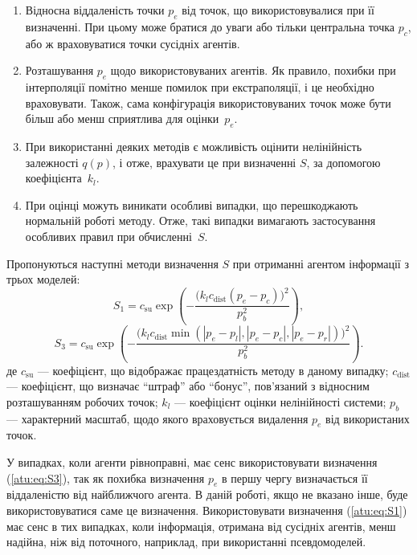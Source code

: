 \begin{enumerate}

  \item
    Відносна віддаленість точки
    $ p_e $ від точок, що використовувалися при її визначенні. При
    цьому може братися до уваги або тільки центральна точка
    $ p_c $, або ж враховуватися точки сусідніх агентів.

  \item
    Розташування
    $ p_e $ щодо використовуваних агентів. Як правило, похибки при
    інтерполяції помітно менше помилок при екстраполяції,
    і це необхідно враховувати. Також, сама конфігурація
    використовуваних точок може бути більш або менш сприятлива для
    оцінки~$p_e$.

  \item
    При використанні деяких методів є можливість оцінити
    нелінійність залежності
    $q(p)$, і отже, врахувати це при визначенні
    $ S $, за допомогою коефіцієнта~$k_l$.

  \item
    При оцінці можуть виникати особливі випадки, що перешкоджають
    нормальній роботі методу. Отже, такі випадки вимагають
    застосування особливих правил при обчисленні~$S$.

\end{enumerate}

Пропонуються наступні
методи визначення $S$ при отриманні агентом інформації з трьох моделей:
%
\begin{equation}
  S_1 = c_\mathrm{su} \exp \left( - \frac{ \big( k_l c_\mathrm{dist} ( p_e - p_c ) \big)^2 }{p_b^2} \right)
  ,
  \label{atu:eq:S1}
\end{equation}
%
\begin{equation}
  S_3 = c_\mathrm{su} \exp \left( - \frac{ \big( k_l c_\mathrm{dist} \min( |p_e - p_l|,|p_e - p_c|, |p_e - p_r| ) \big)^2 }{p_b^2} \right)
  .
  \label{atu:eq:S3}
\end{equation}
%
де
$c_\mathrm{su}$ ---
коефіцієнт, що відображає працездатність методу в даному випадку;
$c_\mathrm{dist}$ ---
коефіцієнт, що визначає ``штраф'' або ``бонус'', пов'язаний з відносним розташуванням робочих точок;
$k_l$ ---
коефіцієнт оцінки нелінійності системи;
$p_b$ ---
характерний масштаб, щодо якого враховується видалення $p_e$ від використаних точок.


У випадках, коли агенти рівноправні, має сенс використовувати визначення
(\ref{atu:eq:S3}), так як похибка визначення $p_e$ в першу чергу визначається її
віддаленістю від найближчого агента. В даній роботі, якщо не вказано інше, буде
використовуватися саме це визначення.
Використовувати визначення (\ref{atu:eq:S1}) має сенс в тих випадках,
коли інформація, отримана від сусідніх агентів, менш надійна,
ніж від поточного, наприклад, при використанні псевдомоделей.

